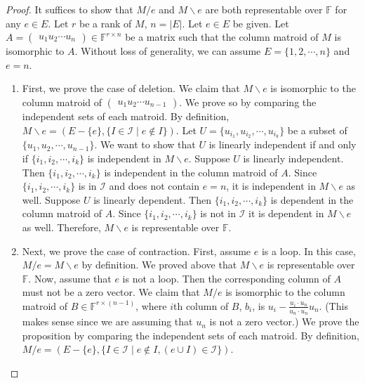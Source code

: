 \begin{proof}
It suffices to show that $M / e$ and $M \backslash e$ are both representable over $\mathbb{F}$ for any $e \in E$.
Let $r$ be a rank of $M$, $n = \lvert E \rvert$.
Let $e \in E$ be given.
Let $A = \begin{pmatrix}u_1 u_2 \cdots u_n\end{pmatrix} \in \mathbb{F}^{r \times n}$ be a matrix such that the column matroid of $M$ is isomorphic to $A$.
Without loss of generality, we can assume $E = \{ 1, 2, \cdots, n \}$ and $e = n$.
\begin{enumerate}
\item 
  First, we prove the case of deletion.
  We claim that $M \backslash e$ is isomorphic to the column matroid of $\begin{pmatrix} u_1 u_2 \cdots u_{n-1} \end{pmatrix}$.
  We prove so by comparing the independent sets of each matroid.
  By definition, $M \backslash e = (E - \{ e \}, \{ I \in \mathcal{I} \mid e \notin I \})$.
  Let $U = \{ u_{i_1}, u_{i_2}, \cdots, u_{i_k} \}$ be a subset of $\{ u_1, u_2, \cdots, u_{n-1} \}$.
  We want to show that $U$ is linearly independent if and only if $\{ i_1, i_2, \cdots, i_k \}$ is independent in $M \backslash e$.
  Suppose $U$ is linearly independent. 
  Then $\{ i_1, i_2, \cdots, i_k \}$ is independent in the column matroid of $A$.
  Since $\{ i_1, i_2, \cdots, i_k \}$ is in $\mathcal{I}$ and does not contain $e = n$, it is independent in $M \backslash e$ as well.
  Suppose $U$ is linearly dependent. 
  Then $\{ i_1, i_2, \cdots, i_k \}$ is dependent in the column matroid of $A$.
  Since $\{ i_1, i_2, \cdots, i_k \}$ is not in $\mathcal{I}$ it is dependent in $M \backslash e$ as well.
  Therefore, $M \backslash e$ is representable over $\mathbb{F}$.
\item
  Next, we prove the case of contraction.
  First, assume $e$ is a loop.
  In this case, $M / e = M \backslash e$ by definition.
  We proved above that $M \backslash e$ is representable over $\mathbb{F}$.
  Now, assume that $e$ is not a loop.
  Then the corresponding column of $A$ must not be a zero vector.
  We claim that $M / e$ is isomorphic to the column matroid of $B \in \mathbb{F}^{r \times (n-1)}$, 
  where $i$th column of $B$, $b_i$, is $\displaystyle u_i - \frac{u_i \cdot u_n}{u_n \cdot u_n} u_n$.
  (This makes sense since we are assuming that $u_n$ is not a zero vector.)
  We prove the proposition by comparing the independent sets of each matroid.
  By definition, $M / e = (E - \{ e \}, \{ I \in \mathcal{I} \mid e \notin I, (e \cup I) \in \mathcal{I}\})$.

\end{enumerate}
\end{proof}
